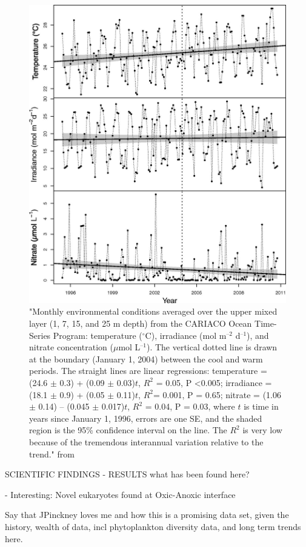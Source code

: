 \begin{figure}
\centering
\includegraphics[trim = 0mm 0mm 0mm 0mm, clip, width=0.7\linewidth]{./Chp1-Intro/IRWIN_F1.large.jpg}
\caption[Scheme]{\small {"Monthly environmental conditions averaged over the upper mixed layer (1, 7, 15, and 25 m depth) from the CARIACO Ocean Time-Series Program: temperature ($^\circ$C), irradiance (mol m$^{–2}$ d$^{–1}$), and nitrate concentration ($\mu$mol L$^{–1}$). The vertical dotted line is drawn at the boundary (January 1, 2004) between the cool and warm periods. The straight lines are linear regressions: temperature = (24.6 $\pm$ 0.3) + (0.09 $\pm$ 0.03)$t$, $R^2$ = 0.05, P \textless 0.005; irradiance = (18.1 $\pm$ 0.9) + (0.05 $\pm$ 0.11)$t$, $R^2$= 0.001, P = 0.65; nitrate = (1.06 $\pm$ 0.14) – (0.045 $\pm$ 0.017)$t$, $R^2$ = 0.04, P = 0.03, where $t$ is time in years since January 1, 1996, errors are one SE, and the shaded region is the 95\% confidence interval on the line. The $R^2$ is very low because of the tremendous interannual variation relative to the trend." from \cite{Irwin2015}}}
\label{CARIACO-map}
\end{figure}


SCIENTIFIC FINDINGS - RESULTS what has been found here?

- Interesting: Novel eukaryotes found at Oxic-Anoxic interface \citep{Stoeck2003}

Say that JPinckney loves me
and how this is a promising data set, given the history, wealth of data, incl phytoplankton diversity data, and long term trends here.

